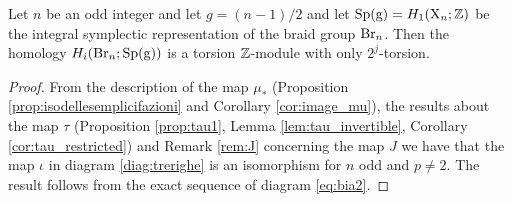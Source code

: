 \begin{thm}
Let $n$ be an odd integer and let $g = (n-1)/2$ and let $\operatorname{Sp({g})}= H_1(\mathrm{X}_n;\mathbb{Z})$ be the integral symplectic representation of the braid group $\operatorname{Br}_n$.
Then the homology  $H_i(\operatorname{Br}_n; \operatorname{Sp({g})})$ is a torsion $\mathbb{Z}$-module
with only $2^j$-torsion.
\end{thm}
\begin{proof}
From the description of the map $\mu_*$ (Proposition \ref{prop:isodellesemplicifazioni} and Corollary \ref{cor:image_mu}), the results about the map $\tau$ (Proposition \ref{prop:tau1}, Lemma \ref{lem:tau_invertible}, Corollary \ref{cor:tau_restricted}) and 
Remark \ref{rem:J} concerning the map $J$
we have that the map $\iota$ in diagram \eqref{diag:trerighe} is an isomorphism for $n$ odd and $p \neq 2$.
The result follows from the exact sequence of diagram \eqref{eq:bia2}.
\end{proof}